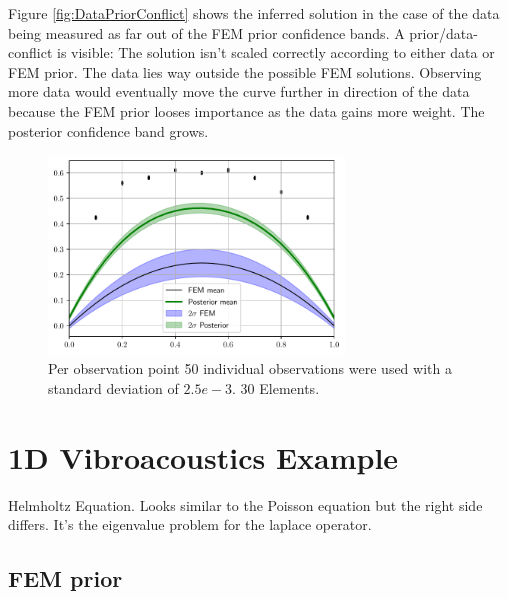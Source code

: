 \documentclass[%
  a4paper,oneside,%
  11pt,%
  smallchapters,
  green,%
  rgb, <cmyk>
  ]{tubsbook}
\begin{document}
Figure \ref{fig:DataPriorConflict} shows the inferred solution in the case of the data being measured as far out of the FEM prior confidence bands. A prior/data-conflict is visible: The solution isn't scaled correctly according to either data or FEM prior. The data lies way outside the possible FEM solutions. Observing more data would eventually move the curve further in direction of the data because the FEM prior looses importance as the data gains more weight. The posterior confidence band grows.
\begin{figure}[h]
\includegraphics[width=0.7\textwidth]{pics/DataPriorMismatch.pdf}
\centering
\caption{Per observation point 50 individual observations were used with a standard deviation of $2.5e-3$. 30 Elements.}
\end{figure}
\label{fig:DataPriorConflict}


\section{1D Vibroacoustics Example}
Helmholtz Equation. Looks similar to the Poisson equation but the right side differs. It's the eigenvalue problem for the laplace operator.



\subsection{FEM prior}
\end{document}

